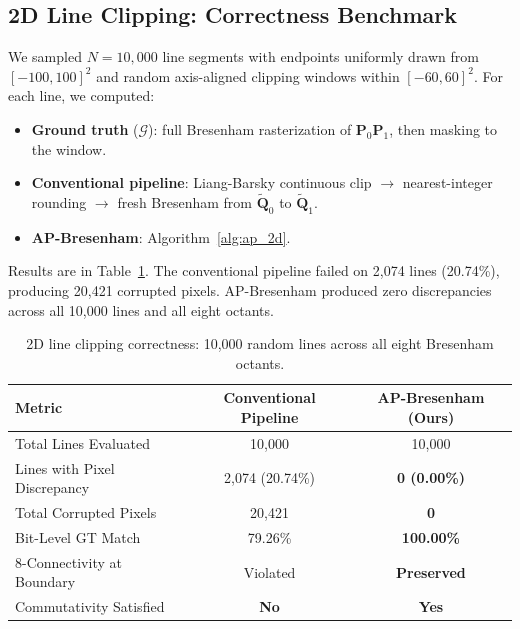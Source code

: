 \documentclass[12pt,a4paper]{article}
\theoremstyle{definition}
\begin{document}
\subsection{2D Line Clipping: Correctness Benchmark}
\label{sec:exp_2d_correct}

We sampled $N = 10{,}000$ line segments with endpoints
uniformly drawn from $[-100,100]^2$ and random
axis-aligned clipping windows within $[-60,60]^2$. For
each line, we computed:
\begin{itemize}
  \item[(a)] \textbf{Ground truth} ($\mathcal{G}$): full
    Bresenham rasterization of
    $\mathbf{P}_0\mathbf{P}_1$, then masking to the window.
  \item[(b)] \textbf{Conventional pipeline}:
    Liang-Barsky continuous clip $\to$ nearest-integer
    rounding $\to$ fresh Bresenham from
    $\tilde{\mathbf{Q}}_0$ to $\tilde{\mathbf{Q}}_1$.
  \item[(c)] \textbf{AP-Bresenham}: Algorithm~\ref{alg:ap_2d}.
\end{itemize}

Results are in Table~\ref{tab:2d_correctness}. The
conventional pipeline failed on 2,074 lines (20.74\%),
producing 20,421 corrupted pixels. AP-Bresenham produced
zero discrepancies across all 10,000 lines and all eight
octants.

\begin{table}[tb]
\centering
\caption{2D line clipping correctness: 10,000 random
lines across all eight Bresenham octants.}
\label{tab:2d_correctness}
\begin{tabular}{lcc}
\toprule
\textbf{Metric} &
  \textbf{Conventional Pipeline} &
  \textbf{AP-Bresenham (Ours)} \\
\midrule
Total Lines Evaluated         & 10,000          & 10,000 \\
Lines with Pixel Discrepancy  & 2,074 (20.74\%) & \textbf{0 (0.00\%)} \\
Total Corrupted Pixels        & 20,421          & \textbf{0} \\
Bit-Level GT Match            & 79.26\%         & \textbf{100.00\%} \\
8-Connectivity at Boundary    & Violated        & \textbf{Preserved} \\
Commutativity Satisfied       & \textbf{No}     & \textbf{Yes} \\
\bottomrule
\end{tabular}
\end{table}
\end{document}
